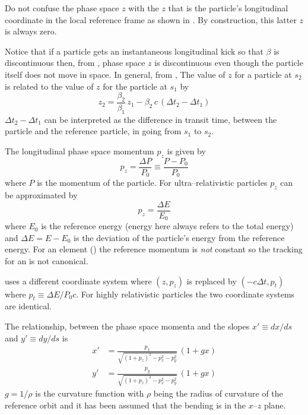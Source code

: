 Do not confuse the phase space $z$ with the $z$ that is the particle's longitudinal coordinate in
the local reference frame as shown in . By construction, this latter $z$ is
always zero.

Notice that if a particle gets an instantaneous longitudinal kick so that $\beta$ is discontinuous
then, from , phase space $z$ is discontinuous even though the particle itself does not
move in space. In general, from , The value of $z$ for a particle at $s_2$ is related to
the value of $z$ for the particle at $s_1$ by
\begin{equation}
  z_2 = \frac{\beta_2}{\beta_1} \, z_1 - 
  \beta_2 \, c \, (\Delta t_2 - \Delta t_1)
  \label{zbbzb}
\end{equation}
$\Delta t_2 - \Delta t_1$ can be interpreted as the difference in transit time, between the particle
and the reference particle, in going from $s_1$ to $s_2$.

The longitudinal phase space momentum $p_z$ is given by
\begin{equation}
  p_z = \frac{\Delta P}{P_0} \equiv \frac{P - P_0}{P_0}
  \label{ppppp}
\end{equation}
where $P$ is the momentum of the particle. For ultra--relativistic particles $p_z$ can be
approximated by
\begin{equation}
  p_z = \frac{\Delta E}{E_0}
\end{equation}
where $E_0$ is the reference energy (energy here always refers to the total energy) and $\Delta E =
E - E_0$ is the deviation of the particle's energy from the reference energy. For an 
element () the reference momentum is {\it not} constant so the tracking for an
 is not canonical.

\mad uses a different coordinate system where $(z, p_z)$ is replaced by $(-c\Delta t, p_t)$ where
$p_t \equiv \Delta E / P_0 c$. For highly relativistic particles the two coordinate systems are
identical.

The relationship, between the phase space momenta and the slopes $x' \equiv dx/ds$ and $y' \equiv dy/ds$
is
\begin{align}
  x' &= \frac{p_x}{\sqrt{(1 + p_z)^2 - p_x^2 - p_y^2}} \, (1 + g x) \\
  y' &= \frac{p_y}{\sqrt{(1 + p_z)^2 - p_x^2 - p_y^2}} \, (1 + g x) 
  \label{xpa1p}
\end{align}
$g = 1/\rho$ is the curvature function with $\rho$ being the radius of curvature of the reference
orbit and it has been assumed that the bending is in the $x$--$z$ plane.

